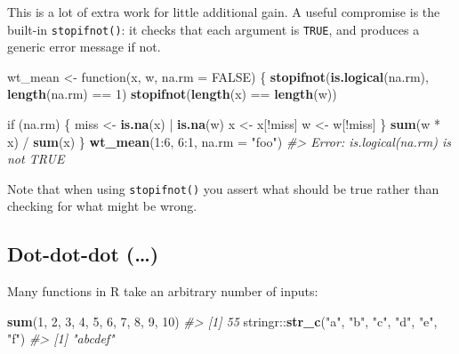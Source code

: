 \documentclass[]{book}
\newenvironment{Shaded}{\begin{snugshade}}{\end{snugshade}}
\newcommand{\KeywordTok}[1]{\textcolor[rgb]{0.13,0.29,0.53}{\textbf{{#1}}}}
\newcommand{\DataTypeTok}[1]{\textcolor[rgb]{0.13,0.29,0.53}{{#1}}}
\newcommand{\DecValTok}[1]{\textcolor[rgb]{0.00,0.00,0.81}{{#1}}}
\newcommand{\StringTok}[1]{\textcolor[rgb]{0.31,0.60,0.02}{{#1}}}
\newcommand{\CommentTok}[1]{\textcolor[rgb]{0.56,0.35,0.01}{\textit{{#1}}}}
\newcommand{\OtherTok}[1]{\textcolor[rgb]{0.56,0.35,0.01}{{#1}}}
\newcommand{\NormalTok}[1]{{#1}}
\begin{document}
This is a lot of extra work for little additional gain. A useful
compromise is the built-in \texttt{stopifnot()}: it checks that each
argument is \texttt{TRUE}, and produces a generic error message if not.

\begin{Shaded}
\begin{Highlighting}[]
\NormalTok{wt_mean <-}\StringTok{ }\NormalTok{function(x, w, }\DataTypeTok{na.rm =} \OtherTok{FALSE}\NormalTok{) \{}
  \KeywordTok{stopifnot}\NormalTok{(}\KeywordTok{is.logical}\NormalTok{(na.rm), }\KeywordTok{length}\NormalTok{(na.rm) ==}\StringTok{ }\DecValTok{1}\NormalTok{)}
  \KeywordTok{stopifnot}\NormalTok{(}\KeywordTok{length}\NormalTok{(x) ==}\StringTok{ }\KeywordTok{length}\NormalTok{(w))}
  
  \NormalTok{if (na.rm) \{}
    \NormalTok{miss <-}\StringTok{ }\KeywordTok{is.na}\NormalTok{(x) |}\StringTok{ }\KeywordTok{is.na}\NormalTok{(w)}
    \NormalTok{x <-}\StringTok{ }\NormalTok{x[!miss]}
    \NormalTok{w <-}\StringTok{ }\NormalTok{w[!miss]}
  \NormalTok{\}}
  \KeywordTok{sum}\NormalTok{(w *}\StringTok{ }\NormalTok{x) /}\StringTok{ }\KeywordTok{sum}\NormalTok{(x)}
\NormalTok{\}}
\KeywordTok{wt_mean}\NormalTok{(}\DecValTok{1}\NormalTok{:}\DecValTok{6}\NormalTok{, }\DecValTok{6}\NormalTok{:}\DecValTok{1}\NormalTok{, }\DataTypeTok{na.rm =} \StringTok{"foo"}\NormalTok{)}
\CommentTok{#> Error: is.logical(na.rm) is not TRUE}
\end{Highlighting}
\end{Shaded}

Note that when using \texttt{stopifnot()} you assert what should be true
rather than checking for what might be wrong.

\subsection{Dot-dot-dot (\ldots{})}\label{dot-dot-dot}

Many functions in R take an arbitrary number of inputs:

\begin{Shaded}
\begin{Highlighting}[]
\KeywordTok{sum}\NormalTok{(}\DecValTok{1}\NormalTok{, }\DecValTok{2}\NormalTok{, }\DecValTok{3}\NormalTok{, }\DecValTok{4}\NormalTok{, }\DecValTok{5}\NormalTok{, }\DecValTok{6}\NormalTok{, }\DecValTok{7}\NormalTok{, }\DecValTok{8}\NormalTok{, }\DecValTok{9}\NormalTok{, }\DecValTok{10}\NormalTok{)}
\CommentTok{#> [1] 55}
\NormalTok{stringr::}\KeywordTok{str_c}\NormalTok{(}\StringTok{"a"}\NormalTok{, }\StringTok{"b"}\NormalTok{, }\StringTok{"c"}\NormalTok{, }\StringTok{"d"}\NormalTok{, }\StringTok{"e"}\NormalTok{, }\StringTok{"f"}\NormalTok{)}
\CommentTok{#> [1] "abcdef"}
\end{Highlighting}
\end{Shaded}
\end{document}
